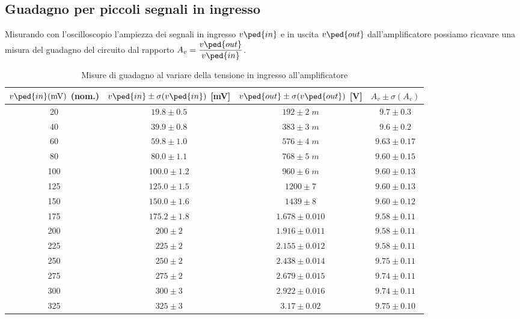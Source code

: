 \documentclass[10pt,a4paper]{article}
\begin{document}
\subsection{Guadagno per piccoli segnali in ingresso}
Misurando con l'oscilloscopio l'ampiezza dei segnali in ingresso $v\ped{in}$
e in uscita $v\ped{out}$ dall'amplificatore possiamo ricavare una misura del
guadagno del circuito dal rapporto $A_v = \dfrac{v\ped{out}}{v\ped{in}}$.
\begin{table}[htb]
\centering
\begin{tabular}{cccc}
\toprule
$v\ped{in}(\si{m\V})$ (nom.) & $v\ped{in} \pm \sigma(v\ped{in})$ [mV] & $v\ped{out} \pm \sigma(v\ped{out})$ [V] & $A_v \pm \sigma(A_v)$ \\
\midrule
\midrule
20 & $19.8 \pm 0.5$ & $192 \pm 2 \; \si{m}$ & $9.7 \pm 0.3$ \\
40 & $39.9 \pm 0.8$ & $383 \pm 3 \; \si{m}$ & $9.6 \pm 0.2$ \\
60 & $59.8 \pm 1.0$ & $576 \pm 4 \; \si{m}$ & $9.63 \pm 0.17$ \\
80 & $80.0 \pm 1.1$ & $768 \pm 5 \; \si{m}$ & $9.60 \pm 0.15$ \\
100 & $100.0 \pm 1.2$ & $960 \pm 6 \; \si{m}$ & $9.60 \pm 0.13$ \\
125 & $125.0 \pm 1.5$ & $1200 \pm 7$ & $9.60 \pm 0.13$ \\
150 & $150.0 \pm 1.6$ & $1439 \pm 8$ & $9.60 \pm 0.12$ \\
175 & $175.2 \pm 1.8$ & $1.678 \pm 0.010$ & $9.58 \pm 0.11$ \\
200 & $200 \pm 2$ & $1.916 \pm 0.011$ & $9.58 \pm 0.11$ \\
225 & $225 \pm 2$ & $2.155 \pm 0.012$ & $9.58 \pm 0.11$ \\
250 & $250 \pm 2$ & $2.438 \pm 0.014$ & $9.75 \pm 0.11$ \\
275 & $275 \pm 2$ & $2.679 \pm 0.015$ & $9.74 \pm 0.11$ \\
300 & $300 \pm 3$ & $2.922 \pm 0.016$ & $9.74 \pm 0.11$ \\
325 & $325 \pm 3$ & $3.17 \pm 0.02$ & $9.75\pm 0.10$ \\
\bottomrule
\end{tabular} 
\caption{Misure di guadagno al variare della tensione in ingresso
all'amplificatore \label{tab: bjtmes}}
\end{table}
\end{document}
